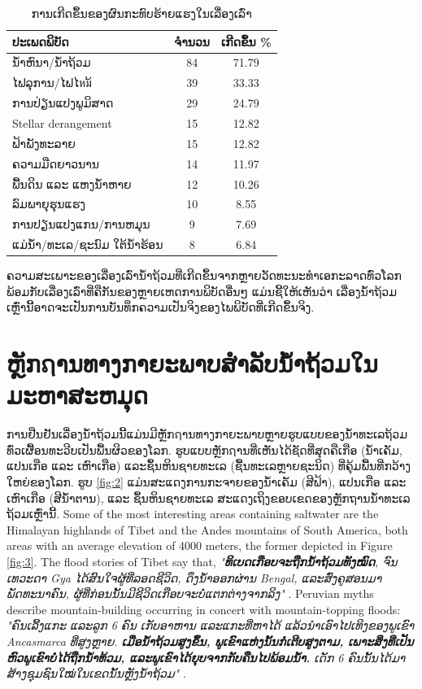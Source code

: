 \documentclass[10pt,twocolumn,letterpaper]{article}
\begin{document}
\begin{table}[ht]
\begin{center}
\renewcommand{\arraystretch}{1.2}  %
\begin{tabular}{|l|c|c|}
\hline
\textbf{ປະເພດພິບັດ} & \textbf{ຈຳນວນ} & \textbf{ເກີດຂຶ້ນ \%} \\
\hline\hline
ນ້ຳຫົນາ/ນ້ຳຖ້ວມ            & 84 & 71.79 \\
ໄຟລຸການ/ໄຟໄหม້ & 39 & 33.33 \\
ການປ່ຽນແປງພູມິສາດ   & 29 & 24.79 \\

Stellar derangement     & 15 & 12.82 \\
ຟ້າພັງທະລາຍ           & 15 & 12.82 \\
ຄວາມມືດຍາວນານ      & 14 & 11.97 \\
ພື້ນດິນ ແລະ ແຫງນ້ຳຫາຍ    & 12 & 10.26 \\
ລົມພາຍຸຮຸນແຮງ          & 10 & 8.55  \\
ການປຽນແປງແກນ/ການຫມຸນ & 9 & 7.69  \\
ແມ່ນ້ຳ/ທະເລ/ຊະນົມ ໃຕ້ນ້ຳຮ້ອນ & 8 & 6.84 \\
\hline
\end{tabular}
\end{center}
\caption{ການເກີດຂຶ້ນຂອງຜົນກະທົບຮ້າຍແຮງໃນເລື່ອງເລົ່າ}
\label{tab: 1}
\end{table}

ຄວາມສະເພາະຂອງເລື່ອງເລົ່ານ້ຳຖ້ວມທີ່ເກີດຂຶ້ນຈາກຫຼາຍວັດທະນະທຳເອກະລາດທົ່ວໂລກ ພ້ອມກັບເລື່ອງເລົ່າທີ່ຄືກັນຂອງຫຼາຍເຫດການພິບັດອື່ນໆ ແມ່ນຊີ້ໃຫ້ເຫັນວ່າ ເລື່ອງນ້ຳຖ້ວມເຫຼົ່ານີ້ອາດຈະເປັນການບັນທຶກຄວາມເປັນຈິງຂອງໄພພິບັດທີ່ເກີດຂຶ້ນຈິງ.

\section{ຫຼັກຐານທາງກາຍະພາບສໍາລັບນ້ຳຖ້ວມໃນມະຫາສະຫມຸດ}

ການຢືນຢັນເລື່ອງນ້ຳຖ້ວມນີ້ແມ່ນມີຫຼັກຐານທາງກາຍະພາບຫຼາຍຮູບແບບຂອງນ້ຳທະເລຖ້ວມທົ່ວເຜື້ອນທະວີບເປັນພື້ນຜິວຂອງໂລກ. ຮູບແບບຫຼັກຐານທີ່ເຫັນໄດ້ຊັດທີ່ສຸດຄືເກືອ (ນ້ຳເຄັມ, ແປນເກືອ ແລະ ເຫົາເກືອ) ແລະຊຶ້ນຫິນຊາຍທະເລ (ຊື້ນທະເລຫຼາຍຊະນິດ) ທີ່ຄຸ້ມພື້ນທີ່ກວ້າງໃຫຍ່ຂອງໂລກ. ຮູບ \ref{fig:2} ແມ່ນສະແດງການກະຈາຍຂອງນ້ຳເຄັມ (ສີຟ້າ), ແປນເກືອ ແລະ ເຫົາເກືອ (ສີນໍ້າຕານ), ແລະ ຊຶ້ນຫິນຊາຍທະເລ \cite{15,16,86,87} ສະແດງເຖິງຂອບເຂດຂອງຫຼັກຖານນ້ຳທະເລຖ້ວມເຫຼົ່ານີ້.
Some of the most interesting areas containing saltwater are the Himalayan highlands of Tibet and the Andes mountains of South America, both areas with an average elevation of 4000 meters, the former depicted in Figure \ref{fig:3}. The flood stories of Tibet say that, \textit{"\textbf{ທິເບດເກືອບຈະຖືກນ້ຳຖ້ວມທັງໝົດ}, ຈົນເທວະດາ Gya ໄດ້ສົນໃຈຜູ້ທີ່ລອດຊີວິດ, ດຶງນ້ຳອອກຜ່ານ Bengal, ແລະສົ່ງຄູສອນມາພັດທະນາຄົນ, ຜູ້ທີ່ກ່ອນນັ້ນມີຊີວິດເກືອບຈະບໍ່ແຕກຕ່າງຈາກລິງ"} \cite{3}. Peruvian myths describe mountain-building occurring in concert with mountain-topping floods: \textit{"ຄົນເລີ້ງແກະ ແລະລູກ 6 ຄົນ ເກັບອາຫານ ແລະແກະທີ່ຫາໄດ້ ແລ້ວນຳເອົາໄປເທິງຂອງພູເຂົາ Ancasmarca ທີ່ສູງຫຼາຍ. \textbf{ເມື່ອນ້ຳຖ້ວມສູງຂຶ້ນ, ພູເຂົາແຫ່ງນັ້ນກໍ່ເຕີບສູງຕາມ, ເພາະສິ່ງທີ່ເປັນຫົວພູເຂົາບໍ່ໄດ້ຖືກນ້ຳທ້ວມ, ແລະພູເຂົາໄດ້ຍຸບຈາກກັບຄືນໄປພ້ອມນ້ຳ.} ເດັກ 6 ຄົນນັ້ນໄດ້ມາສ້າງຊຸມຊົນໃໝ່ໃນເຂດນັ້ນຫຼັງນ້ຳຖ້ວມ"} \cite{3}.
\end{document}

